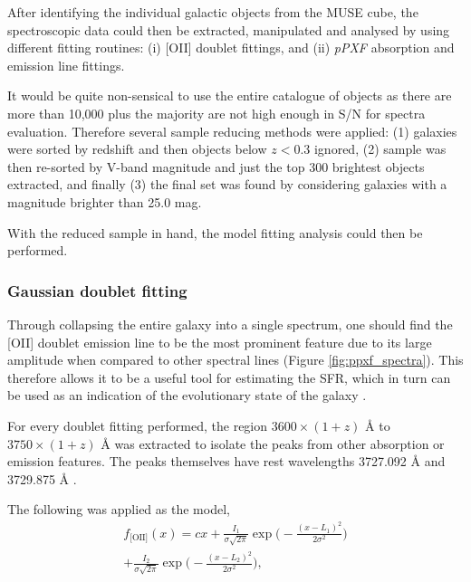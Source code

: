 \documentclass[12pt, twocolumn]{revtex4}    %
\begin{document}
After identifying the individual galactic objects from the MUSE cube, the spectroscopic data could then be extracted, manipulated and analysed by using different fitting routines: (i) [OII] doublet fittings, and (ii) \textit{pPXF} absorption and emission line fittings.


It would be quite non-sensical to use the entire catalogue of objects as there are more than 10,000 plus the majority are not high enough in S/N for spectra evaluation. Therefore several sample reducing methods were applied: (1) galaxies were sorted by redshift and then objects below $z<0.3$ ignored, (2) sample was then re-sorted by V-band magnitude and just the top 300 brightest objects extracted, and finally (3) the final set was found by considering galaxies with a magnitude brighter than 25.0 mag. 

With the reduced sample in hand, the model fitting analysis could then be performed.





\subsubsection{Gaussian doublet fitting}

Through collapsing the entire galaxy into a single spectrum, one should find the [OII] doublet emission line to be the most prominent feature due to its large amplitude when compared to other spectral lines (Figure \ref{fig:ppxf_spectra}). This therefore allows it to be a useful tool for estimating the SFR, which in turn can be used as an indication of the evolutionary state of the galaxy \citep{maddox_oxygen}.

For every doublet fitting performed, the region $3600\times(1+z)$ {\AA} to $3750\times(1+z)$ {\AA} was extracted to isolate the peaks from other absorption or emission features. The peaks themselves have rest wavelengths 3727.092 {\AA} and 3729.875 {\AA} \citep{sdss_lines}. 

The following was applied as the model,
\begin{multline}
f_{\text{[OII]}}(x) = cx + \frac{I_1}{\sigma \sqrt{2\pi}} \exp{\Bigg(-\frac{(x-L_1)^2}{2\sigma^2}\Bigg)} \\
+ \frac{I_2}{\sigma \sqrt{2\pi}} \exp{\Bigg(-\frac{(x-L_2)^2}{2\sigma^2}\Bigg)},
\label{eqn:doublet}
\end{multline} 
\end{document}
